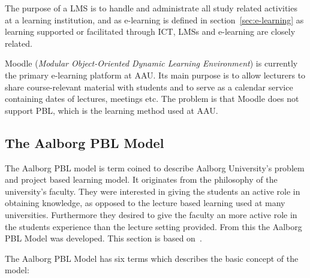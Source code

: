 The purpose of a LMS is to handle and administrate all study related activities at a learning institution, and as e-learning is defined in section~\ref{sec:e-learning} as learning supported or facilitated through ICT, LMSs and e-learning are closely related.

Moodle (\emph{Modular Object-Oriented Dynamic Learning Environment}) \citep{moodle} is currently the primary e-learning platform at AAU. Its main purpose is to allow lecturers to share course-relevant material with students and to serve as a calendar service containing dates of lectures, meetings etc. The problem is that Moodle does not support PBL, which is the learning method used at AAU.

\subsection{The Aalborg PBL Model}
\label{sub:aaupbl}
The Aalborg PBL model is term coined to describe Aalborg University's problem and project based learning model. It originates from the philosophy of the university's faculty. They were interested in giving the students an active role in obtaining knowledge, as opposed to the lecture based learning used at many universities. Furthermore they desired to give the faculty an more active role in the students experience than the lecture setting provided. From this the Aalborg PBL Model was developed. This section is based on~\citep{Barge10}.

The Aalborg PBL Model has six terms which describes the basic concept of the model:

